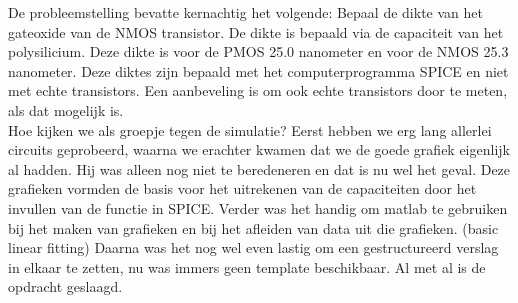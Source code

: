 

De probleemstelling bevatte kernachtig het volgende: Bepaal de dikte van het gateoxide van de NMOS transistor. De dikte is bepaald via de capaciteit van het polysilicium. Deze dikte is voor de PMOS 25.0 nanometer en voor de NMOS 25.3 nanometer. Deze diktes zijn bepaald met het computerprogramma SPICE en niet met echte transistors. Een aanbeveling is om ook echte transistors door te meten, als dat mogelijk is. \\ \newline
Hoe kijken we als groepje tegen de simulatie? Eerst hebben we erg lang allerlei circuits geprobeerd, waarna we erachter kwamen dat we de goede grafiek eigenlijk al hadden. Hij was alleen nog niet te beredeneren en dat is nu wel het geval. Deze grafieken vormden de basis voor het uitrekenen van de capaciteiten door het invullen van de functie in SPICE. Verder was het handig om matlab te gebruiken bij het maken van grafieken en bij het afleiden van data uit die grafieken. (basic linear fitting) Daarna was het nog wel even lastig om een gestructureerd verslag in elkaar te zetten, nu was immers geen template beschikbaar. Al met al is de opdracht geslaagd. 

